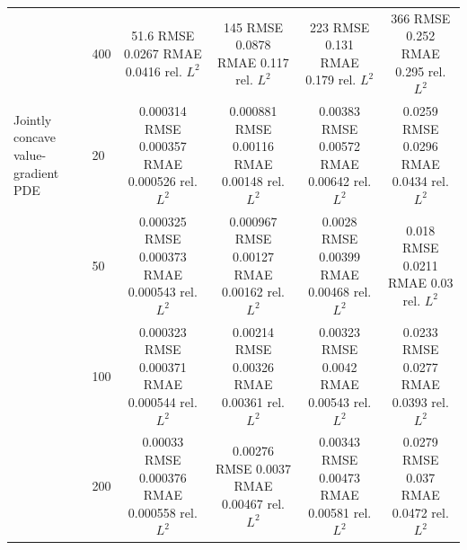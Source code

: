\begin{tabular}{llcccc}
 & 400 & \shortstack{51.6 RMSE\\0.0267 RMAE\\0.0416 rel. $L^2$} & \shortstack{145 RMSE\\0.0878 RMAE\\0.117 rel. $L^2$} & \shortstack{223 RMSE\\0.131 RMAE\\0.179 rel. $L^2$} & \shortstack{366 RMSE\\0.252 RMAE\\0.295 rel. $L^2$} \\
\addlinespace
Jointly concave value-gradient PDE & 20 & \shortstack{0.000314 RMSE\\0.000357 RMAE\\0.000526 rel. $L^2$} & \shortstack{0.000881 RMSE\\0.00116 RMAE\\0.00148 rel. $L^2$} & \shortstack{0.00383 RMSE\\0.00572 RMAE\\0.00642 rel. $L^2$} & \shortstack{0.0259 RMSE\\0.0296 RMAE\\0.0434 rel. $L^2$} \\
 & 50 & \shortstack{0.000325 RMSE\\0.000373 RMAE\\0.000543 rel. $L^2$} & \shortstack{0.000967 RMSE\\0.00127 RMAE\\0.00162 rel. $L^2$} & \shortstack{0.0028 RMSE\\0.00399 RMAE\\0.00468 rel. $L^2$} & \shortstack{0.018 RMSE\\0.0211 RMAE\\0.03 rel. $L^2$} \\
 & 100 & \shortstack{0.000323 RMSE\\0.000371 RMAE\\0.000544 rel. $L^2$} & \shortstack{0.00214 RMSE\\0.00326 RMAE\\0.00361 rel. $L^2$} & \shortstack{0.00323 RMSE\\0.0042 RMAE\\0.00543 rel. $L^2$} & \shortstack{0.0233 RMSE\\0.0277 RMAE\\0.0393 rel. $L^2$} \\
 & 200 & \shortstack{0.00033 RMSE\\0.000376 RMAE\\0.000558 rel. $L^2$} & \shortstack{0.00276 RMSE\\0.0037 RMAE\\0.00467 rel. $L^2$} & \shortstack{0.00343 RMSE\\0.00473 RMAE\\0.00581 rel. $L^2$} & \shortstack{0.0279 RMSE\\0.037 RMAE\\0.0472 rel. $L^2$} \\

\end{tabular}
